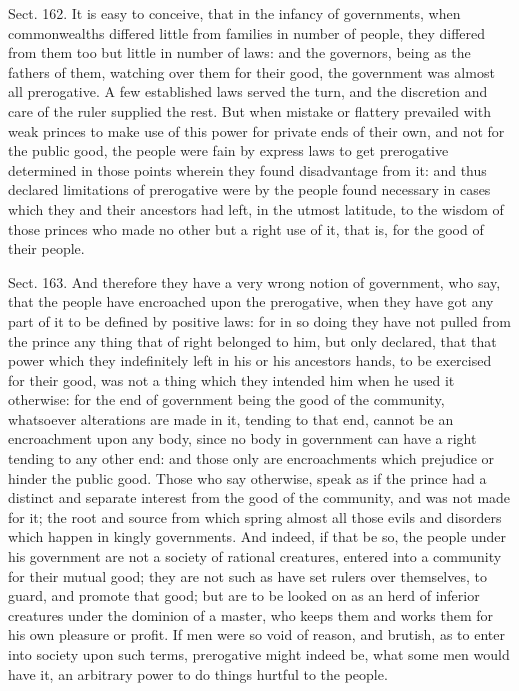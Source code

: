 \documentclass[11pt,openany]{book}
\begin{document}
Sect. 162. It is easy to conceive, that in the infancy of governments, when commonwealths differed little from families in number of people, they differed from them too but little in number of laws: and the governors, being as the fathers of them, watching over them for their good, the government was almost all prerogative. A few established laws served the turn, and the discretion and care of the ruler supplied the rest. But when mistake or flattery prevailed with weak princes to make use of this power for private ends of their own, and not for the public good, the people were fain by express laws to get prerogative determined in those points wherein they found disadvantage from it: and thus declared limitations of prerogative were by the people found necessary in cases which they and their ancestors had left, in the utmost latitude, to the wisdom of those princes who made no other but a right use of it, that is, for the good of their people.

Sect. 163. And therefore they have a very wrong notion of government, who say, that the people have encroached upon the prerogative, when they have got any part of it to be defined by positive laws: for in so doing they have not pulled from the prince any thing that of right belonged to him, but only declared, that that power which they indefinitely left in his or his ancestors hands, to be exercised for their good, was not a thing which they intended him when he used it otherwise: for the end of government being the good of the community, whatsoever alterations are made in it, tending to that end, cannot be an encroachment upon any body, since no body in government can have a right tending to any other end: and those only are encroachments which prejudice or hinder the public good. Those who say otherwise, speak as if the prince had a distinct and separate interest from the good of the community, and was not made for it; the root and source from which spring almost all those evils and disorders which happen in kingly governments. And indeed, if that be so, the people under his government are not a society of rational creatures, entered into a community for their mutual good; they are not such as have set rulers over themselves, to guard, and promote that good; but are to be looked on as an herd of inferior creatures under the dominion of a master, who keeps them and works them for his own pleasure or profit. If men were so void of reason, and brutish, as to enter into society upon such terms, prerogative might indeed be, what some men would have it, an arbitrary power to do things hurtful to the people.
\end{document}
